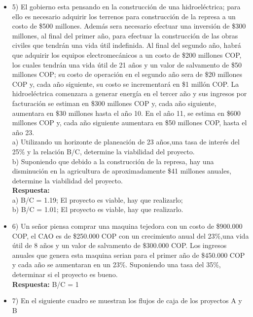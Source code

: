 \begin{itemize}
\item 5)	El gobierno esta pensando en la construcción de una hidroeléctrica; para ello es necesario adquirir los terrenos para construcción de la represa a un costo de \$500 millones. Además sera necesario efectuar una inversión de \$300 millones, al final del primer año, para efectuar la construcción de las obras civiles que tendrán una vida útil indefinida. Al final del segundo año, habrá que adquirir los equipos electromecánicos a un costo de \$200 millones COP, los cuales  tendrán una vida útil de 21 años y un valor de salvamento de \$50 millones COP; su costo de operación en el segundo año sera de \$20 millones COP y, cada año siguiente, su costo se incrementará en \$1 millón COP. La hidroeléctrica comenzara a generar energía en el tercer año y sus ingresos por facturación se estiman en \$300 millones COP y, cada año siguiente, aumentara en \$30 millones hasta el año 10. En el año 11, se estima en \$600 millones COP y, cada año siguiente aumentara en \$50 millones COP, hasta el año 23.\\
      
      a) Utilizando un horizonte de planeación de 23 años,una tasa de interés del 25\% y la relación B/C, determine la viabilidad del proyecto.\\
      
      b) Suponiendo que debido a la construcción de la represa, hay una disminución en la agricultura de aproximadamente \$41 millones anuales, determine la viabilidad del proyecto.\\
      
      \textbf{Respuesta:} \\a) B/C = 1.19; El proyecto es viable, hay que realizarlo;\\ b) B/C = 1.01; El proyecto es viable, hay que realizarlo.
      \medskip
      
\item 6)	Un señor piensa comprar una maquina tejedora con un costo de \$900.000 COP, el CAO es de \$250.000 COP con un crecimiento anual del 23\%,una vida útil de 8 años y un valor de salvamento de \$300.000 COP. Los ingresos anuales que genera esta maquina serian para el primer año de \$450.000 COP y cada año se aumentaran en un 23\%. Suponiendo una tasa del 35\%, determinar si el proyecto es bueno.\\
      
      \textbf{Respuesta:} B/C = 1
      \medskip
      
\item 7)	En el siguiente cuadro se muestran los flujos de caja de los proyectos A y B\\
      

\end{itemize}
